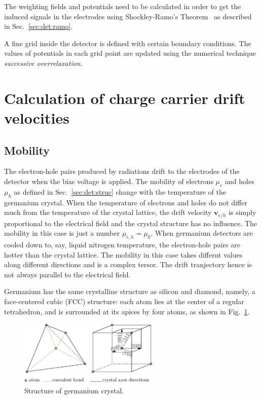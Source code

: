 The weighting fields and potentials need to be calculated in order to get the induced signals in the electrodes using Shockley-Ramo's Theorem~\cite{Gat82, Rad88, He00} as described in Sec.~\ref{sec:det:ramo}. 

A fine grid inside the detector is defined with certain boundary conditions. The values of potentials in each grid point are updated using the numerical technique \emph{successive overrelaxation}.

\section{Calculation of charge carrier drift velocities}
\label{sec:pss:drift}
\subsection{Mobility}
\label{sec:pss:mobi}
The electron-hole pairs produced by radiations drift to the electrodes of the detector when the bias voltage is applied. The mobility of electrons $\mu_{e}$ and holes $\mu_{h}$ as defined in Sec.~\ref{sec:det:struc} change with the
temperature of the germanium crystal. When the temperature of electrons and holes do not differ much from the temperature of the crystal lattice, the drift velocity $\mathbf{v}_{e/h}$ is simply proportional to the electrical field and the crystal structure has no influence. The mobility in this case is just a number $\mu_{e,h} = \mu_{0}$. When germanium detectors are cooled down to, say, liquid nitrogen temperature, the electron-hole pairs are hotter than the crystal lattice. The mobility in this case takes differnt values along different directions and is a complex tersor. The drift tranjectory hence is not always parallel to the electrical field.

Germanium has the same crystalline structure as silicon and diamond, namely, a face-centered cubic (FCC) structure: each atom lies at the center of a regular tetrahedron, and is surrounded at its apices by four atoms, as shown in Fig.~\ref{fig:pss:xtal}.
\begin{figure}
\centering
\includegraphics[width=0.6\textwidth]{xtalStruc}  
\caption{Structure of germanium crystal.}
\label{fig:pss:xtal}
\end{figure}

